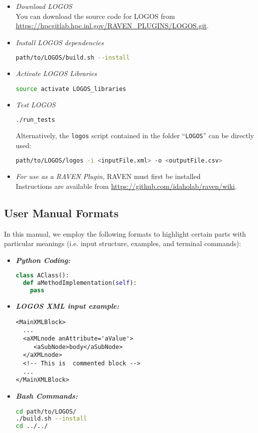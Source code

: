 \begin{itemize}
  \item \textit{Download LOGOS}
    \\ You can download the source code for LOGOS from \url{https://hpcgitlab.hpc.inl.gov/RAVEN_PLUGINS/LOGOS.git}.
  \item \textit{Install LOGOS dependencies}
	\begin{lstlisting}[language=bash]
	path/to/LOGOS/build.sh --install
	\end{lstlisting}
  \item \textit{Activate LOGOS Libraries}
  \begin{lstlisting}[language=bash]
  source activate LOGOS_libraries
  \end{lstlisting}
  \item \textit{Test LOGOS}
	\begin{lstlisting}[language=bash]
	./run_tests
	\end{lstlisting}
  	Alternatively, the \texttt{logos} script
    contained in the folder ``\texttt{LOGOS}'' can be directly used:
\begin{lstlisting}[language=bash]
path/to/LOGOS/logos -i <inputFile.xml> -o <outputFile.csv>
\end{lstlisting}
	\item \textit{For use as a RAVEN Plugin}, RAVEN must first be installed
		\\ Instructions are available from \url{https://github.com/idaholab/raven/wiki}.
\end{itemize}

\subsection{User Manual Formats}
In this manual, we employ the following formats to highlight certain parts with
particular meanings (i.e. input structure, examples, and terminal commands):

\begin{itemize}
\item \textbf{\textit{Python Coding:}}
\begin{lstlisting}[language=python]
class AClass():
  def aMethodImplementation(self):
    pass
\end{lstlisting}
\item \textbf{\textit{LOGOS XML input example:}}
\begin{lstlisting}[style=XML,morekeywords={anAttribute}]
<MainXMLBlock>
  ...
  <aXMLnode anAttribute='aValue'>
     <aSubNode>body</aSubNode>
  </aXMLnode>
  <!-- This is  commented block -->
  ...
</MainXMLBlock>
\end{lstlisting}
\item \textbf{\textit{Bash Commands:}}
\begin{lstlisting}[language=bash]
cd path/to/LOGOS/
./build.sh --install
cd ../../
\end{lstlisting}
\end{itemize}

